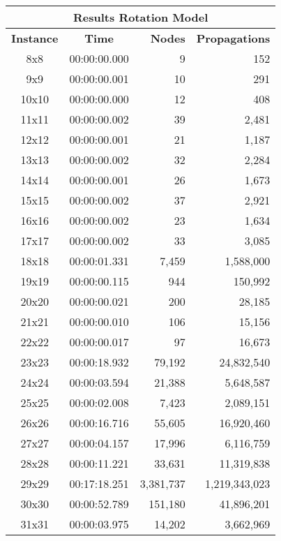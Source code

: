 
\begin{center}
    \begin{tabular}{|c|c|r|r|}
        \hline
        \multicolumn{4}{|c|}{\textbf{Results Rotation Model}} \\
        \hline
        \textbf{Instance} & \textbf{Time} & \textbf{Nodes} & \textbf{Propagations} \\
        
        \hline
		8x8 & 00:00:00.000 & 9 & 152 \\ \hline
		9x9 & 00:00:00.001 & 10 & 291 \\ \hline
		10x10 & 00:00:00.000 & 12 & 408 \\ \hline
		11x11 & 00:00:00.002 & 39 & 2,481 \\ \hline
		12x12 & 00:00:00.001 & 21 & 1,187 \\ \hline
		13x13 & 00:00:00.002 & 32 & 2,284 \\ \hline
		14x14 & 00:00:00.001 & 26 & 1,673 \\ \hline
		15x15 & 00:00:00.002 & 37 & 2,921 \\ \hline
		16x16 & 00:00:00.002 & 23 & 1,634 \\ \hline
		17x17 & 00:00:00.002 & 33 & 3,085 \\ \hline
		18x18 & 00:00:01.331 & 7,459 & 1,588,000 \\ \hline
		19x19 & 00:00:00.115 & 944 & 150,992 \\ \hline
		20x20 & 00:00:00.021 & 200 & 28,185 \\ \hline
		21x21 & 00:00:00.010 & 106 & 15,156 \\ \hline
		22x22 & 00:00:00.017 & 97 & 16,673 \\ \hline
		23x23 & 00:00:18.932 & 79,192 & 24,832,540 \\ \hline
		24x24 & 00:00:03.594 & 21,388 & 5,648,587 \\ \hline
		25x25 & 00:00:02.008 & 7,423 & 2,089,151 \\ \hline
		26x26 & 00:00:16.716 & 55,605 & 16,920,460 \\ \hline
		27x27 & 00:00:04.157 & 17,996 & 6,116,759 \\ \hline
		28x28 & 00:00:11.221 & 33,631 & 11,319,838 \\ \hline
		29x29 & 00:17:18.251 & 3,381,737 & 1,219,343,023 \\ \hline
		30x30 & 00:00:52.789 & 151,180 & 41,896,201 \\ \hline
		31x31 & 00:00:03.975 & 14,202 & 3,662,969 \\ \hline

\end{tabular}
\end{center}
